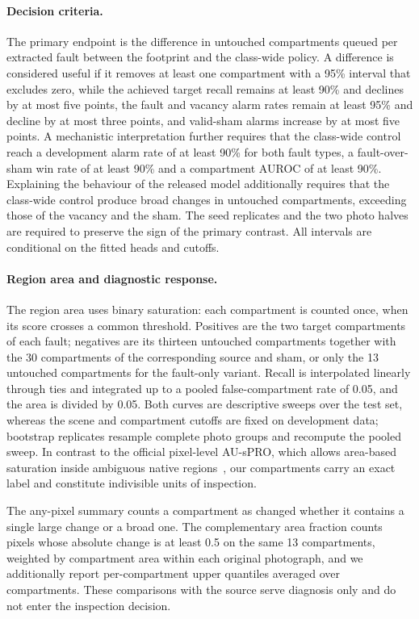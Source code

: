 \documentclass[10pt,twocolumn,letterpaper]{article}
\begin{document}
\paragraph{Decision criteria.}
The primary endpoint is the difference in untouched compartments queued per extracted fault between the footprint and the class-wide policy. A difference is considered useful if it removes at least one compartment with a 95\% interval that excludes zero, while the achieved target recall remains at least 90\% and declines by at most five points, the fault and vacancy alarm rates remain at least 95\% and decline by at most three points, and valid-sham alarms increase by at most five points. A mechanistic interpretation further requires that the class-wide control reach a development alarm rate of at least 90\% for both fault types, a fault-over-sham win rate of at least 90\% and a compartment AUROC of at least 90\%. Explaining the behaviour of the released model additionally requires that the class-wide control produce broad changes in untouched compartments, exceeding those of the vacancy and the sham. The seed replicates and the two photo halves are required to preserve the sign of the primary contrast. All intervals are conditional on the fitted heads and cutoffs.

\paragraph{Region area and diagnostic response.}
The region area uses binary saturation: each compartment is counted once, when its score crosses a common threshold. Positives are the two target compartments of each fault; negatives are its thirteen untouched compartments together with the 30 compartments of the corresponding source and sham, or only the 13 untouched compartments for the fault-only variant. Recall is interpolated linearly through ties and integrated up to a pooled false-compartment rate of 0.05, and the area is divided by 0.05. Both curves are descriptive sweeps over the test set, whereas the scene and compartment cutoffs are fixed on development data; bootstrap replicates resample complete photo groups and recompute the pooled sweep. In contrast to the official pixel-level AU-sPRO, which allows area-based saturation inside ambiguous native regions~\cite{bergmann2022}, our compartments carry an exact label and constitute indivisible units of inspection.

The any-pixel summary counts a compartment as changed whether it contains a single large change or a broad one. The complementary area fraction counts pixels whose absolute change is at least 0.5 on the same 13 compartments, weighted by compartment area within each original photograph, and we additionally report per-compartment upper quantiles averaged over compartments. These comparisons with the source serve diagnosis only and do not enter the inspection decision.
\end{document}
